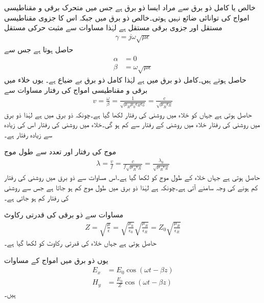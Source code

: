 خالص یا کامل ذو برق سے مراد ایسا ذو برق ہے جس میں متحرک برقی و مقناطیسی امواج کی توانائی ضائع نہیں ہوتی۔خالص ذو برق میں  جبکہ اس کا جزوی مقناطیسی مستقل  اور جزوی برقی مستقل   ہے لہٰذا مساوات  سے مثبت حرکی مستقل
\begin{align*}
\gamma=j \omega \sqrt{\mu \epsilon }
\end{align*}
حاصل ہوتا ہے جس سے
\begin{align}
\alpha&=0\\
\beta&=\omega \sqrt{\mu \epsilon} \label{مساوات_موج_کامل-ذوبرق_بیٹا}
\end{align}
حاصل ہوتے ہیں۔کامل ذو برق میں  ہے لہٰذا کامل ذو برق بے ضیاع ہے۔ یوں خلاء میں برقی و مقناطیسی امواج کی رفتار  مساوات  سے
\begin{align}
v=\frac{\omega}{\beta}=\frac{1}{\sqrt{\mu_R \mu_0 \epsilon_R \epsilon_0}}=\frac{c}{\sqrt{\mu_R \epsilon_R}}
\end{align} 
حاصل ہوتی ہے جہاں  کو خلاء میں روشنی کی رفتار  لکھا گیا ہے۔چونکہ ذو برق میں  ہے  لہٰذا ذو برق میں روشنی کی رفتار خلاء میں روشنی کے رفتار سے کم ہو گی۔خلاء میں روشنی کی رفتار اس کی زیادہ سے زیادہ رفتار ہے۔

موج کی رفتار اور تعدد سے طول موج
\begin{align}
\lambda=\frac{v}{f}=\frac{c}{f \sqrt{\mu_R \epsilon_R}}=\frac{\lambda_0}{\sqrt{\mu_R \epsilon_R}}
\end{align}
حاصل ہوتی ہے جہاں خلاء کے طول موج کو  لکھا گیا ہے۔اس مساوات سے ذو برق میں روشنی کی رفتار کم ہونے کی وجہ سامنے آتی ہے۔چونکہ  ہے لہٰذا ذو برق میں طول موج کم ہو جاتا ہے جس سے روشنی کی رفتار کم ہو جاتی ہے۔


مساوات  سے ذو برقی کی  قدرتی رکاوٹ
\begin{align*}
Z =\sqrt{\frac{\mu}{\epsilon}}=\sqrt{\frac{\mu_0}{\epsilon_0}}\sqrt{\frac{\mu_R}{\epsilon_R}}= Z_0 \sqrt{\frac{\mu_R}{\epsilon_R}}
\end{align*}
حاصل ہوتی ہے جہاں خلاء کی قدرتی رکاوٹ کو  لکھا گیا ہے۔

یوں ذو برق میں امواج کے مساوات
\begin{align}
E_x&=E_0 \cos (\omega t -\beta z)\\
H_y&=\frac{E_0}{Z} \cos (\omega t -\beta z)
\end{align}
ہیں۔

